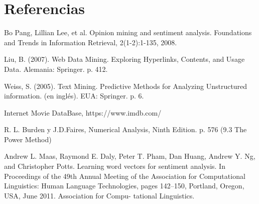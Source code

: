\section{Referencias}
\begin{thebibliography}{9}
Bo Pang, Lillian Lee, et al. Opinion mining and sentiment analysis. Foundations and Trends in Information Retrieval, 2(1-2):1-135, 2008.

Liu, B. (2007). Web Data Mining. Exploring Hyperlinks, Contents, and Usage Data. Alemania: Springer. p. 412.

Weiss, S. (2005). Text Mining. Predictive Methods for Analyzing Unstructured information. (en inglés). EUA: Springer. p. 6.

Internet Movie DataBase, https://www.imdb.com/

R. L. Burden y J.D.Faires, Numerical Analysis, Ninth Edition. p. 576 (9.3 The Power Method)

Andrew L. Maas, Raymond E. Daly, Peter T. Pham, Dan Huang, Andrew Y. Ng, and
Christopher Potts. Learning word vectors for sentiment analysis. In Proceedings of the
49th Annual Meeting of the Association for Computational Linguistics: Human Language
Technologies, pages 142–150, Portland, Oregon, USA, June 2011. Association for Compu-
tational Linguistics.

\end{thebibliography}
